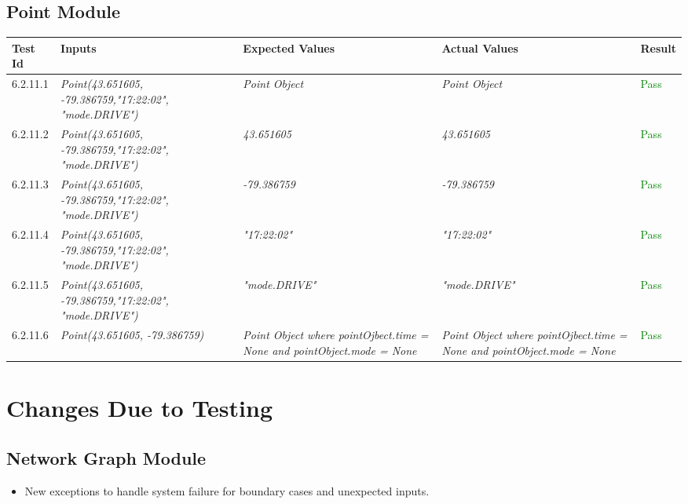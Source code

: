 \documentclass[12pt, titlepage]{article}
\begin{document}
\subsection{Point Module}
\begin{tabular}{ | m{3.5em} | m{4cm}| m{4cm} | m{4cm} | m{1.2cm} | } 
  \hline
  \textbf{Test Id}& \textbf{Inputs} & \textbf{Expected Values} & \textbf{Actual Values} & \textbf{Result} \\ 
  \hline
   6.2.11.1 & \textit{Point(43.651605, -79.386759,"17:22:02", "mode.DRIVE")} & \textit{Point Object} & \textit{Point Object} & \textcolor{green}{Pass} \\ 
  \hline
  6.2.11.2 & \textit{Point(43.651605, -79.386759,"17:22:02", "mode.DRIVE")} & \textit{43.651605} & \textit{43.651605} & \textcolor{green}{Pass} \\ 
  \hline
  6.2.11.3 & \textit{Point(43.651605, -79.386759,"17:22:02", "mode.DRIVE")} & \textit{-79.386759} & \textit{-79.386759} & \textcolor{green}{Pass} \\  
  \hline
  6.2.11.4 & \textit{Point(43.651605, -79.386759,"17:22:02", "mode.DRIVE")} & \textit{"17:22:02"} & \textit{"17:22:02"} & \textcolor{green}{Pass} \\  
  \hline
   6.2.11.5 & \textit{Point(43.651605, -79.386759,"17:22:02", "mode.DRIVE")} & \textit{"mode.DRIVE"} & \textit{"mode.DRIVE"} & \textcolor{green}{Pass} \\
  \hline
   6.2.11.6 & \textit{Point(43.651605, -79.386759)} & \textit{Point Object where pointOjbect.time = None and pointObject.mode = None} & \textit{Point Object where pointOjbect.time = None and pointObject.mode = None} & \textcolor{green}{Pass} \\ 
   \hline
\end{tabular}



\section{Changes Due to Testing}

\subsection{Network Graph Module}
\begin{itemize}
    \item New exceptions to handle system failure for boundary cases and unexpected inputs.
\end{itemize}
\end{document}
